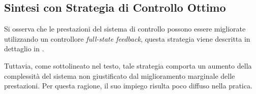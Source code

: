\subsection{Sintesi con Strategia di Controllo Ottimo}
Si osserva che le prestazioni del sistema di controllo possono essere migliorate utilizzando un controllore \textit{full-state feedback}, questa strategia viene descritta in dettaglio in \cite{franklin_feedback_control}.

Tuttavia, come sottolineato nel testo, tale strategia comporta un aumento della complessità del sistema non giustificato dal miglioramento marginale delle prestazioni. Per questa ragione, il suo impiego risulta poco diffuso nella pratica.
